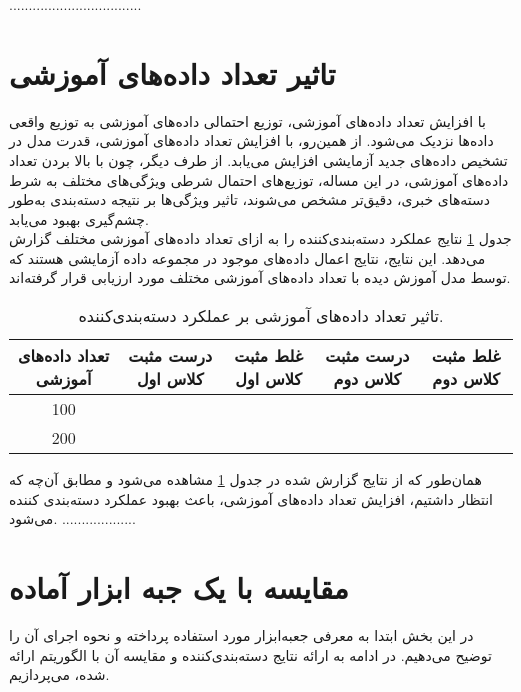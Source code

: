 \documentclass[11.5pt,a4paper]{article}
\begin{document}
..................................

\section{تاثیر تعداد داده‌های آموزشی}

با افزایش تعداد داده‌های آموزشی، توزیع احتمالی داده‌های آموزشی به توزیع واقعی داده‌ها نزدیک می‌شود. از همین‌رو، با افزایش تعداد داده‌های آموزشی، قدرت مدل در تشخیص داده‌های جدید آزمایشی افزایش‌ می‌یابد. از طرف دیگر، چون با بالا بردن تعداد داده‌های آموزشی، در این مساله، توزیع‌های احتمال شرطی ویژگی‌های مختلف به شرط دسته‌های خبری، دقیق‌تر مشخص ‌می‌شوند، تاثیر ویژگی‌ها بر نتیجه دسته‌بندی به‌طور چشم‌گیری بهبود می‌یابد. \\
جدول 
\ref{tbl:dataCount}
نتایج عملکرد دسته‌بندی‌کننده را به ازای تعداد داده‌های آموزشی مختلف گزارش می‌دهد. این نتایج، نتایج اعمال داده‌های موجود در مجموعه داده‌ آزمایشی هستند که توسط مدل آموزش دیده با تعداد داده‌های آموزشی مختلف مورد ارزیابی قرار گرفته‌اند.
\\
\begin{table}[h]
\center
\caption{تاثیر تعداد داده‌های آموزشی بر عملکرد دسته‌بندی‌کننده.}
\label{tbl:dataCount}
\begin{tabular}{c | c | c | c | c}
تعداد داده‌های آموزشی & درست مثبت کلاس اول & غلط مثبت کلاس اول & درست مثبت کلاس دوم & غلط مثبت کلاس دوم
\\
\hline
\hline
100 &&&&
\\
200 &&&&
\\
\end{tabular}
\end{table}

همان‌طور که از نتایج گزارش شده در جدول 
\ref{tbl:dataCount}
مشاهده می‌شود و مطابق آن‌چه که انتظار داشتیم، افزایش تعداد داده‌های آموزشی، باعث بهبود عملکرد دسته‌بندی کننده می‌شود. ...................

\section{مقایسه با یک جبه ابزار آماده}
در این بخش ابتدا به معرفی جعبه‌ابزار مورد استفاده پرداخته و نحوه اجرای آن را توضیح می‌دهیم. در ادامه به ارائه نتایج دسته‌بندی‌کننده و مقایسه آن با الگوریتم ارائه شده، می‌پردازیم.
\end{document}
